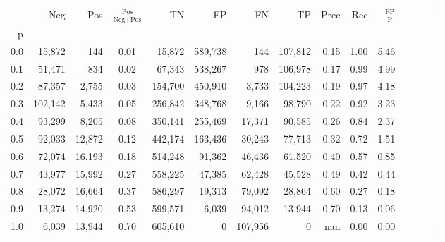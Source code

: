 \begin{tabular}{rrrcrrrrrrrrrrr}
\toprule
{} &      Neg &     Pos & $\frac{\text{Pos}}{\text{Neg}+\text{Pos}}$ &       TN &       FP &       FN &       TP &  Prec &   Rec & $\frac{\text{FP}}{\text{P}}$ \\
p   &          &         &                                            &          &          &          &          &       &       &                              \\
\midrule
0.0 &   15,872 &     144 &                                       0.01 &   15,872 &  589,738 &      144 &  107,812 &  0.15 &  1.00 &                         5.46 \\
0.1 &   51,471 &     834 &                                       0.02 &   67,343 &  538,267 &      978 &  106,978 &  0.17 &  0.99 &                         4.99 \\
0.2 &   87,357 &   2,755 &                                       0.03 &  154,700 &  450,910 &    3,733 &  104,223 &  0.19 &  0.97 &                         4.18 \\
0.3 &  102,142 &   5,433 &                                       0.05 &  256,842 &  348,768 &    9,166 &   98,790 &  0.22 &  0.92 &                         3.23 \\
0.4 &   93,299 &   8,205 &                                       0.08 &  350,141 &  255,469 &   17,371 &   90,585 &  0.26 &  0.84 &                         2.37 \\
0.5 &   92,033 &  12,872 &                                       0.12 &  442,174 &  163,436 &   30,243 &   77,713 &  0.32 &  0.72 &                         1.51 \\
0.6 &   72,074 &  16,193 &                                       0.18 &  514,248 &   91,362 &   46,436 &   61,520 &  0.40 &  0.57 &                         0.85 \\
0.7 &   43,977 &  15,992 &                                       0.27 &  558,225 &   47,385 &   62,428 &   45,528 &  0.49 &  0.42 &                         0.44 \\
0.8 &   28,072 &  16,664 &                                       0.37 &  586,297 &   19,313 &   79,092 &   28,864 &  0.60 &  0.27 &                         0.18 \\
0.9 &   13,274 &  14,920 &                                       0.53 &  599,571 &    6,039 &   94,012 &   13,944 &  0.70 &  0.13 &                         0.06 \\
1.0 &    6,039 &  13,944 &                                       0.70 &  605,610 &        0 &  107,956 &        0 &   nan &  0.00 &                         0.00 \\
\bottomrule
\end{tabular}
